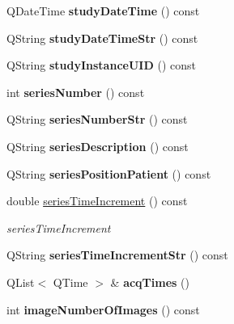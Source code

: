 \begin{DoxyCompactItemize}
\mbox{\label{class_series_info_a2eb0ac1652fc77f6d9d9bcfcae33c5af}} 
Q\+Date\+Time {\bfseries study\+Date\+Time} () const
\item 
\mbox{\label{class_series_info_a99cc72da568ff148637b5f4dff5252c0}} 
Q\+String {\bfseries study\+Date\+Time\+Str} () const
\item 
\mbox{\label{class_series_info_a2decc9e9c01f7a9fc27c6a88f0871039}} 
Q\+String {\bfseries study\+Instance\+U\+ID} () const
\item 
\mbox{\label{class_series_info_a77d678e8efd4564738cdbd1e7accec11}} 
int {\bfseries series\+Number} () const
\item 
\mbox{\label{class_series_info_a5d1cbb206f2ea1c9873ab0b8137ccda1}} 
Q\+String {\bfseries series\+Number\+Str} () const
\item 
\mbox{\label{class_series_info_a713638b77beb8e167bbd55a23e289ec6}} 
Q\+String {\bfseries series\+Description} () const
\item 
\mbox{\label{class_series_info_a631bbb07847fdaab973df74f6f052b0e}} 
Q\+String {\bfseries series\+Position\+Patient} () const
\item 
double \hyperlink{class_series_info_aa3cd8fea1ca4d619817e07be017fb7d6}{series\+Time\+Increment} () const
\begin{DoxyCompactList}\small\item\em series\+Time\+Increment \end{DoxyCompactList}\item 
\mbox{\label{class_series_info_af1da8f078d398e0ab3fc8f5129518e0b}} 
Q\+String {\bfseries series\+Time\+Increment\+Str} () const
\item 
\mbox{\label{class_series_info_a94facc78d30d5daeb6ae28fbdd824c77}} 
Q\+List$<$ Q\+Time $>$ \& {\bfseries acq\+Times} ()
\item 
\mbox{\label{class_series_info_ab6e94bbff402e228a7b680d32d2d1a66}} 
int {\bfseries image\+Number\+Of\+Images} () const

\end{DoxyCompactItemize}
